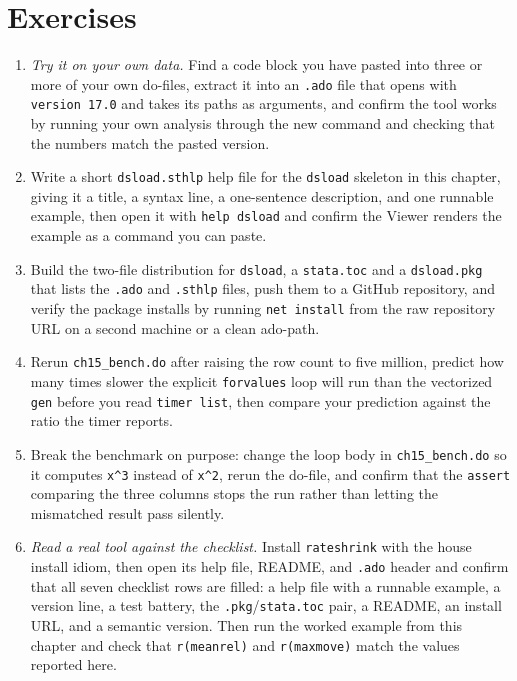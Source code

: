 \section*{Exercises}
\begin{enumerate}
    \item \emph{Try it on your own data.} Find a code block you have pasted into three or more of your own do-files, extract it into an \texttt{.ado} file that opens with \texttt{version 17.0} and takes its paths as arguments, and confirm the tool works by running your own analysis through the new command and checking that the numbers match the pasted version.
    \item Write a short \texttt{dsload.sthlp} help file for the \texttt{dsload} skeleton in this chapter, giving it a title, a syntax line, a one-sentence description, and one runnable example, then open it with \texttt{help dsload} and confirm the Viewer renders the example as a command you can paste.
    \item Build the two-file distribution for \texttt{dsload}, a \texttt{stata.toc} and a \texttt{dsload.pkg} that lists the \texttt{.ado} and \texttt{.sthlp} files, push them to a GitHub repository, and verify the package installs by running \texttt{net install} from the raw repository URL on a second machine or a clean ado-path.
    \item Rerun \texttt{ch15\_bench.do} after raising the row count to five million, predict how many times slower the explicit \texttt{forvalues} loop will run than the vectorized \texttt{gen} before you read \texttt{timer list}, then compare your prediction against the ratio the timer reports.
    \item Break the benchmark on purpose: change the loop body in \texttt{ch15\_bench.do} so it computes \texttt{x\textasciicircum 3} instead of \texttt{x\textasciicircum 2}, rerun the do-file, and confirm that the \texttt{assert} comparing the three columns stops the run rather than letting the mismatched result pass silently.
    \item \emph{Read a real tool against the checklist.} Install \texttt{rateshrink} with the house install idiom, then open its help file, README, and \texttt{.ado} header and confirm that all seven checklist rows are filled: a help file with a runnable example, a version line, a test battery, the \texttt{.pkg}/\texttt{stata.toc} pair, a README, an install URL, and a semantic version. Then run the worked example from this chapter and check that \texttt{r(meanrel)} and \texttt{r(maxmove)} match the values reported here.

\end{enumerate}
